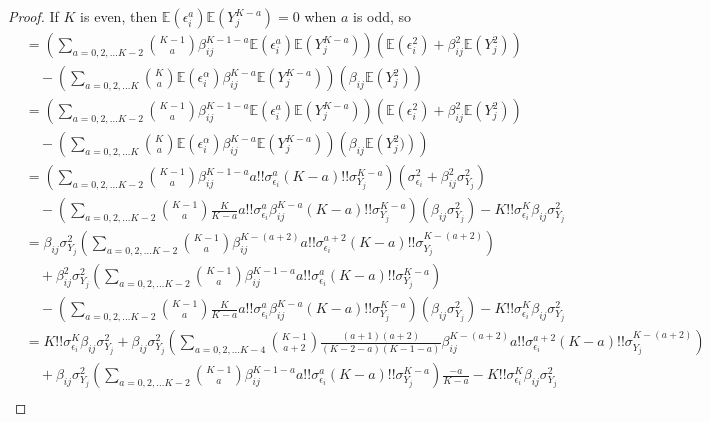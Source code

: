 \documentclass[]{article}
\newcommand{\E}{\mathbb{E}}
\begin{document}
\begin{proof}
If $K$ is even, then $\E(\epsilon_i^a)\E(Y_j^{K-a}) = 0$ when $a$ is odd, so 
\begin{equation}
\begin{aligned}
&= \left(\sum_{a = 0,2,\ldots K-2}{K-1 \choose a} \beta_{ij}^{K-1 - a}\E\left(\epsilon_i^a\right) \E\left(Y_j^{K-a}\right)\right) \left(\E(\epsilon_i^2)  + \beta_{ij}^2\E(Y_j^2) \right)
\\
&\quad - \left(\sum_{a = 0,2,\ldots K}{K \choose a} \E\left(\epsilon_i^\alpha\right) \beta_{ij}^{K - a}\E\left(Y_j^{K - a}\right)\right)\left(\beta_{ij}\E\left(Y_j^2\right) \right)
\\
&=\left(\sum_{a = 0,2,\ldots K-2}{K-1 \choose a} \beta_{ij}^{K-1 - a}\E\left(\epsilon_i^a\right) \E\left(Y_j^{K-a}\right)\right) \left(\E(\epsilon_i^2)  + \beta_{ij}^2\E(Y_j^2) \right)
\\
&\quad - \left(\sum_{a = 0,2,\ldots K}{K \choose a} \E\left(\epsilon_i^\alpha\right) \beta_{ij}^{K - a}\E\left(Y_j^{K - a}\right)\right)\left(\beta_{ij}\E\left(Y_j^2)\right) \right)
\\
&= \left(\sum_{a = 0,2,\ldots K-2}{K-1 \choose a} \beta_{ij}^{K-1 - a}a!! \sigma_{\epsilon_i}^a (K-a)!!\sigma_{Y_j}^{K-a}\right) \left(\sigma_{\epsilon_i}^2  + \beta_{ij}^2\sigma_{Y_j}^2 \right)
\\
&\quad - \left(\sum_{a = 0,2,\ldots K-2}{K-1 \choose a}\frac{K}{K-a} a!!\sigma_{\epsilon_i}^a \beta_{ij}^{K - a}(K-a)!!\sigma_{Y_j}^{K-a}\right)\left(\beta_{ij}\sigma_{Y_j}^2\right) - K!!\sigma_{\epsilon_i}^K\beta_{ij}\sigma_{Y_j}^2
\\
&= \beta_{ij}\sigma_{Y_j}^2\left(\sum_{a = 0,2,\ldots K-2}{K-1 \choose a} \beta_{ij}^{K- (a+2)}a!! \sigma_{\epsilon_i}^{a+2} (K-a)!!\sigma_{Y_j}^{K-(a+2)}\right) 
\\
& \quad + \beta_{ij}^2\sigma_{Y_j}^2\left(\sum_{a = 0,2,\ldots K-2}{K-1 \choose a} \beta_{ij}^{K-1 - a}a!! \sigma_{\epsilon_i}^{a} (K-a)!!\sigma_{Y_j}^{K-a}\right)  \\
&\quad - \left(\sum_{a = 0,2,\ldots K-2}{K-1 \choose a}\frac{K}{K-a} a!!\sigma_{\epsilon_i}^a \beta_{ij}^{K - a}(K-a)!!\sigma_{Y_j}^{K-a}\right)\left(\beta_{ij}\sigma_{Y_j}^2\right) - K!!\sigma_{\epsilon_i}^K\beta_{ij}\sigma_{Y_j}^2
\\
&= K!!\sigma_{\epsilon_i}^K\beta_{ij}\sigma_{Y_j}^2 + \beta_{ij}\sigma_{Y_j}^2\left(\sum_{a = 0,2,\ldots K-4}{K-1 \choose a+2}\frac{(a+1)(a+2)}{(K-2-a)(K-1-a)} \beta_{ij}^{K- (a+2)}a!! \sigma_{\epsilon_i}^{a+2} (K-a)!!\sigma_{Y_j}^{K-(a+2)}\right) 
\\
& \quad + \beta_{ij}\sigma_{Y_j}^2\left(\sum_{a = 0,2,\ldots K-2}{K-1 \choose a} \beta_{ij}^{K-1 - a}a!! \sigma_{\epsilon_i}^{a} (K-a)!!\sigma_{Y_j}^{K-a}\right)\frac{-a}{K-a}  - K!!\sigma_{\epsilon_i}^K\beta_{ij}\sigma_{Y_j}^2\\

\end{aligned}
\end{equation}
\end{proof}
\end{document}
